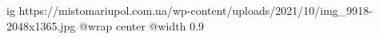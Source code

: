  
 
 
 
 

\ifcmt
  ig https://mistomariupol.com.ua/wp-content/uploads/2021/10/img_9918-2048x1365.jpg
  @wrap center
  @width 0.9
\fi
